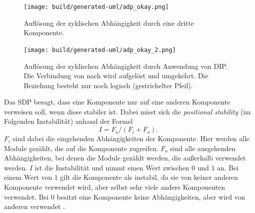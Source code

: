 \begin{figure}
  \centering
  \texttt{[image: build/generated-uml/adp\_okay.png]}
   \caption{Auflösung der zyklischen Abhängigkeit durch eine dritte Komponente.}
   \label{fig:adp_okay}
\end{figure}

\begin{figure}
  \centering
  \texttt{[image: build/generated-uml/adp\_okay\_2.png]}
   \caption{Auflösung der zyklischen Abhängigkeit durch Anwendung von \ac{DIP}. Die Verbindung von  nach  wird aufgelöst und umgekehrt. Die Beziehung besteht nur noch logisch (gestrichelter Pfeil). }
   \label{fig:adp_okay_2}
\end{figure}




 
Das \ac{SDP} besagt, dass eine Komponente nur auf eine anderen Komponente verweisen soll, wenn diese stabiler ist. Dabei misst sich die \textit{positional stability} (im Folgenden Instabilität) anhand der Formel
\begin{equation}
I = F_o / (F_i + F_o).
\end{equation}
$F_i$ sind dabei die eingehenden Abhängigkeiten der Komponente. Hier werden alle Module gezählt, die auf die Komponente zugreifen. $F_o$ sind alle ausgehenden Abhängigkeiten, bei denen die Module gezählt werden, die außerhalb verwendet werden. $I$ ist die Instabilität und nimmt einen Wert zwischen $0$ und $1$ an. Bei einem Wert von $1$ gilt die Komponente als instabil, da sie von keiner anderen Komponente verwendet wird, aber selbst sehr viele andere Komponenten verwendet. Bei $0$ besitzt eine Komponente keine Abhängigkeiten, aber wird von anderen verwendet \citep[vgl.][122]{martin2018}.
 

  
